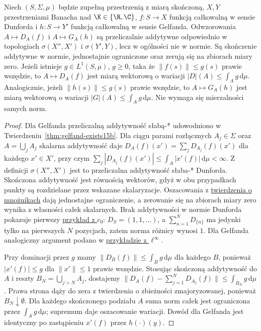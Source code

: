 \begin{stwierdzenie}
\label{prop:dunford-gelfand-additivity15b}
Niech $(S,\Sigma,\mu)$ będzie zupełną przestrzenią z miarą
skończoną, $X,Y$ przestrzeniami Banacha nad
$\K\in\{\R,\C\}$, $f:S\to X$ funkcją całkowalną
w sensie Dunforda i $h:S\to Y'$ funkcją całkowalną
w sensie Gelfanda. Odwzorowania $A\mapsto D_A(f)$
i $A\mapsto G_A(h)$ są przeliczalnie addytywne odpowiednio
w topologiach $\sigma(X'',X')$ i $\sigma(Y',Y)$,
lecz w ogólności nie w normie. Są skończenie addytywne
w normie, jednostajnie ograniczone oraz zerują się na
zbiorach miary zero.
Jeżeli istnieje $g\in L^1(S,\mu)$, $g\ge0$, taka że
$\|f(s)\|\le g(s)$ prawie wszędzie, to
$A\mapsto D_A(f)$ jest miarą wektorową o wariacji
$|D|(A)\le\int_A g\,\mathrm d\mu$.
Analogicznie, jeżeli $\|h(s)\|\le g(s)$ prawie wszędzie,
to $A\mapsto G_A(h)$ jest miarą wektorową
o wariacji $|G|(A)\le\int_A g\,\mathrm d\mu$.
Nie wymaga się mierzalności samych norm.
\end{stwierdzenie}
\begin{proof}
Dla Gelfanda przeliczalną addytywność słabą-*
udowodniono w Twierdzeniu~\ref{thm:gelfand-exists15b}.
Dla ciągu parami rozłącznych $A_j\in\Sigma$ oraz
$A=\bigcup_j A_j$ skalarna addytywność daje
$D_A(f)(x')=\sum_j D_{A_j}(f)(x')$ dla każdego $x'\in X'$,
przy czym $\sum_j|D_{A_j}(f)(x')|\le
\int_A|x'(f)|\,\mathrm d\mu<\infty$.
Z definicji $\sigma(X'',X')$ jest to przeliczalna
addytywność słaba-* Dunforda.
Skończona addytywność jest równością wektorów, gdyż
w obu przypadkach punkty są rozdzielane przez wskazane
skalaryzacje. Oszacowania z
\hyperref[thm:vector-integral-multipliers15b]{twierdzenia o mnożnikach}
dają jednostajne ograniczenie, a zerowanie się na zbiorach
miary zero wynika z własności całek skalarnych.
Brak addytywności w normie Dunforda pokazuje pierwszy
\hyperref[ex:dunford-not-pettis15b]{przykład z $c_0$}:
$D_S=(1,1,\ldots)$, a $\sum_{n=1}^ND_{\{n\}}$ ma jedynki
tylko na pierwszych $N$ pozycjach, zatem norma różnicy
wynosi $1$. Dla Gelfanda analogiczny argument podano
w \hyperref[ex:gelfand-weakstar15b]{przykładzie z $\ell^\infty$}.

Przy dominacji przez $g$ mamy
$\|D_B(f)\|\le\int_Bg\,\mathrm d\mu$ dla każdego $B$,
ponieważ $|x'(f)|\le g$ dla $\|x'\|\le1$ prawie wszędzie.
Stosując skończoną addytywność do $A$ i reszty
$B_N=\bigcup_{j>N}A_j$, dostajemy
$\|D_A(f)-\sum_{j=1}^ND_{A_j}(f)\|\le\int_{B_N}g\,\mathrm d\mu$.
Prawa strona dąży do zera z twierdzenia o zbieżności
zmajoryzowanej, ponieważ $B_N\downarrow\emptyset$.
Dla każdego skończonego podziału $A$ suma norm całek
jest ograniczona przez $\int_Ag\,\mathrm d\mu$;
supremum daje oszacowanie wariacji. Dowód dla Gelfanda
jest identyczny po zastąpieniu $x'(f)$ przez $h(\cdot)(y)$.
\end{proof}

